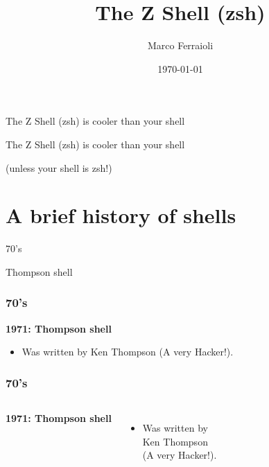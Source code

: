\documentclass[aspectratio=169]{beamer}
\title[Short title]{The Z Shell (zsh)}
\author{Marco Ferraioli}
\institute[IrLUG]
{
Linux Day Avellino\\
marcoferraioli@live.com\\
marcoferraioli.com\\
@overflowsystem
}
\date{\today} %
\begin{document}
\begin{frame}
	\titlepage %
\end{frame}


\begin{frame}
    \Huge{\centerline{The Z Shell (zsh) is cooler than your shell}}
\end{frame}



\begin{frame}
    \Huge{\centerline{The Z Shell (zsh) is cooler than your shell}}
    \Huge{\centerline{(unless your shell is zsh!)}}
\end{frame}



\section{A brief history of shells} 

\begin{frame}
    \Huge{\centerline{70's}}
\end{frame}

\begin{frame}
    \Huge{\centerline{Thompson shell}}
\end{frame}

\begin{frame}
	\frametitle{ 70's}
		\textbf{1971: Thompson shell}
		\begin{itemize}
			\item Was written by Ken Thompson (A very Hacker!).
		\end{itemize}
\end{frame}

\begin{frame}
	\frametitle{ 70's}
	\begin{columns}[c]
			\textbf{1971: Thompson shell}
			\begin{itemize}
				\item Was written by\\
					Ken Thompson\\
					(A very Hacker!).
			\end{itemize}
			\begin{figure}[h!]
			\end{figure}		
	\end{columns}
\end{frame}
\end{document}
